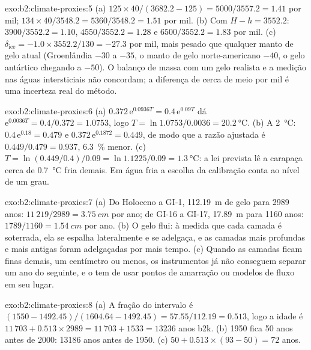 \begin{solution}{exo:b2:climate-proxies:5}
(a) $125 \times 40/(3682.2 - 125) = 5000/3557.2 = 1.41$ por mil; $134 \times 40/3548.2 =
5360/3548.2 = 1.51$ por mil. (b) Com $H - h = 3552.2$: $3900/3552.2 = 1.10$, $4550/3552.2 = 1.28$
e $6500/3552.2 = 1.83$ por mil. (c) $\delta_{\mathrm{ice}} = -1.0 \times 3552.2/130 = -27.3$ por
mil, mais pesado que qualquer manto de gelo atual (Groenlândia $-30$ a $-35$, o manto de gelo norte-americano
$-40$, o gelo antártico chegando a $-50$). O balanço de massa com um gelo realista e a medição nas águas
intersticiais não concordam; a diferença de cerca de meio por mil é uma incerteza real do método.
\end{solution}

\begin{solution}{exo:b2:climate-proxies:6}
(a) $0.372\,\mathrm{e}^{0.0936T} = 0.4\,\mathrm{e}^{0.09T}$ dá $\mathrm{e}^{0.0036T} =
0.4/0.372 = 1.0753$, logo $T = \ln 1.0753/0.0036 = \qty{20.2}{\celsius}$. (b) A
\qty{2}{\celsius}: $0.4\,\mathrm{e}^{0.18} = 0.479$ e $0.372\,\mathrm{e}^{0.1872} = 0.449$, de modo que a
razão ajustada é $0.449/0.479 = 0.937$, \qty{6.3}{\percent} menor. (c) $T = \ln(0.449/0.4)/0.09 =
\ln 1.1225/0.09 = \qty{1.3}{\celsius}$: a lei prevista lê a carapaça cerca de
\qty{0.7}{\celsius} fria demais. Em água fria a escolha da calibração conta ao nível de um
grau.
\end{solution}

\begin{solution}{exo:b2:climate-proxies:7}
(a) Do Holoceno a GI-1, \qty{112.19}{m} de gelo para 2989 anos: $11\,219/2989 =
\qty{3.75}{cm}$ por ano; de GI-16 a GI-17, \qty{17.89}{m} para 1160 anos: $1789/1160 =
\qty{1.54}{cm}$ por ano. (b) O gelo
flui: à medida que cada camada é soterrada, ela se espalha lateralmente e se adelgaça, e as camadas mais profundas e mais antigas
foram adelgaçadas por mais tempo. (c) Quando as camadas ficam finas demais, um centímetro ou menos, os instrumentos
já não conseguem separar um ano do seguinte, e o  tem de usar pontos de amarração ou modelos de fluxo
em seu lugar.
\end{solution}

\begin{solution}{exo:b2:climate-proxies:8}
(a) A fração do intervalo é $(1550 - 1492.45)/(1604.64 - 1492.45) = 57.55/112.19 = 0.513$,
logo a idade é $11\,703 + 0.513 \times 2989 = 11\,703 + 1533 = \num{13236}$ anos b2k. (b) 1950 fica 50
anos antes de 2000: \num{13186} anos antes de 1950. (c) $50 + 0.513 \times (93 - 50) = 72$ anos.
\end{solution}

